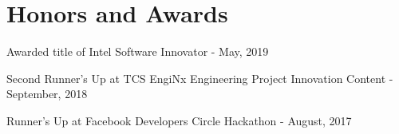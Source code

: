 \documentclass[a4paper,10pt]{article}
\makeatletter
\newcommand{\resumeItem}[2]{
  \item\small{
    \textbf{#1}{: #2 \vspace{-2pt}}
  }
}
\newcommand{\resumeSubheading}[4]{
  \vspace{-1pt}\item
    \begin{tabular*}{0.97\textwidth}{l@{\extracolsep{\fill}}r}
      \textbf{#1} & #2 \\
      \textit{#3} & \textit{#4} \\
    \end{tabular*}\vspace{-5pt}
}
\newcommand{\resumeSubItem}[2]{\resumeItem{#1}{#2}\vspace{-3pt}}
\newcommand{\resumeSubHeadingListStart}{\begin{itemize}[leftmargin=*]}
\newcommand{\resumeSubHeadingListEnd}{\end{itemize}}
\makeatother
\begin{document}
\section{Honors and Awards}
\begin{description}[font=$\bullet$]
  \item {Awarded title of Intel Software Innovator - May, 2019}
\vspace{-5pt}
  \item {Second Runner's Up at TCS EngiNx Engineering Project Innovation Content - September, 2018 }
\vspace{-5pt}
  \item {Runner's Up at Facebook Developers Circle Hackathon - August, 2017}
\end{description}
\vspace{-5pt}


\end{document}
